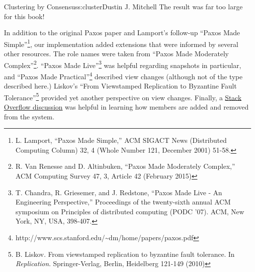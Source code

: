 \begin{aosachapter}{Clustering by Consensus}{s:cluster}{Dustin J. Mitchell}
The result was far too large for this book!

\label{references}

In addition to the original Paxos paper and Lamport's follow-up ``Paxos
Made Simple''\footnote{L. Lamport, ``Paxos Made Simple,'' ACM SIGACT
  News (Distributed Computing Column) 32, 4 (Whole Number 121, December
  2001) 51-58.}, our implementation added extensions that were informed
by several other resources. The role names were taken from ``Paxos Made
Moderately Complex''\footnote{R. Van Renesse and D. Altinbuken, ``Paxos
  Made Moderately Complex,'' ACM Computing Survey 47, 3, Article 42
  (February 2015)}. ``Paxos Made Live''\footnote{T. Chandra, R.
  Griesemer, and J. Redstone, ``Paxos Made Live - An Engineering
  Perspective,'' Proceedings of the twenty-sixth annual ACM symposium on
  Principles of distributed computing (PODC '07). ACM, New York, NY,
  USA, 398-407.} was helpful regarding snapshots in particular, and
``Paxos Made Practical''\footnote{http://www.scs.stanford.edu/\textasciitilde{}dm/home/papers/paxos.pdf}
described view changes (although not of the type described here.)
Liskov's ``From Viewstamped Replication to Byzantine Fault
Tolerance''\footnote{B. Liskov. From viewstamped replication to
  byzantine fault tolerance. In \emph{Replication}. Springer-Verlag,
  Berlin, Heidelberg 121-149 (2010)} provided yet another perspective on
view changes. Finally, a
\href{http://stackoverflow.com/questions/21353312/in-part-time-parliament-why-does-using-the-membership-from-decree-n-3-work-to}{Stack
Overflow discussion} was helpful in learning how members are added and
removed from the system.

\end{aosachapter}
